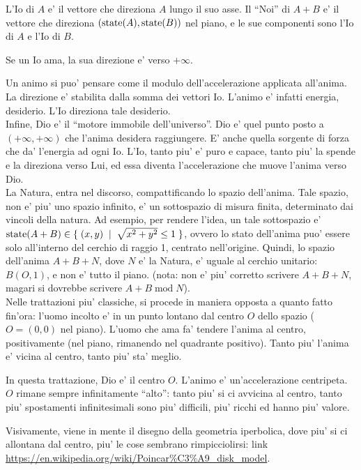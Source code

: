 L'Io di $A$ e' il vettore che direziona $A$ lungo il suo asse. Il ``Noi'' di $A+B$ e' il vettore che direziona $(\textrm{state}(A),\textrm{state}(B))$ nel piano, e le sue componenti sono l'Io di $A$ e l'Io di $B$.

Se un Io ama, la sua direzione e' verso $+\infty$.

Un animo si puo' pensare come il modulo dell'accelerazione applicata all'anima. La direzione e' stabilita dalla somma dei vettori Io. L'animo e' infatti energia, desiderio. L'Io direziona tale desiderio.\\

Infine, Dio e' il ``motore immobile dell'universo''. Dio e' quel punto posto a $(+\infty, +\infty)$ che l'anima desidera raggiungere. E' anche quella sorgente di forza che da' l'energia ad ogni Io. L'Io, tanto piu' e' puro e capace, tanto piu' la spende e la direziona verso Lui, ed essa diventa l'accelerazione che muove l'anima verso Dio.\\

La Natura, entra nel discorso, compattificando lo spazio dell'anima. Tale spazio, non e' piu' uno spazio infinito, e' un sottospazio di misura finita, determinato dai vincoli della natura. Ad esempio, per rendere l'idea, un tale sottospazio e' $\textrm{state}(A+B) \in \{\; (x,y) \;\; | \;\; \sqrt{x^2+y^2} \le 1 \;\}$, ovvero lo stato dell'anima puo' essere solo all'interno del cerchio di raggio 1, centrato nell'origine. Quindi, lo spazio dell'anima $A+B+N$, dove $N$ e' la Natura, e' uguale al cerchio unitario: $B(O,1)$, e non e' tutto il piano. (nota: non e' piu' corretto scrivere $A+B+N$, magari si dovrebbe scrivere $A+B\;\textrm{mod}\;N$).\\

Nelle trattazioni piu' classiche, si procede in maniera opposta a quanto fatto fin'ora: l'uomo incolto e' in un punto lontano dal centro $O$ dello spazio ($O=(0,0)$ nel piano). L'uomo che ama fa' tendere l'anima al centro, positivamente (nel piano, rimanendo nel quadrante positivo). Tanto piu' l'anima e' vicina al centro, tanto piu' sta' meglio.

In questa trattazione, Dio e' il centro $O$. L'animo e' un'accelerazione centripeta. $O$ rimane sempre infinitamente ``alto'': tanto piu' si ci avvicina al centro, tanto piu' spostamenti infinitesimali sono piu' difficili, piu' ricchi ed hanno piu' valore.

Visivamente, viene in mente il disegno della geometria iperbolica, dove piu' si ci allontana dal centro, piu' le cose sembrano rimpicciolirsi: link  \url{https://en.wikipedia.org/wiki/Poincar\%C3\%A9\_disk\_model}.\\


